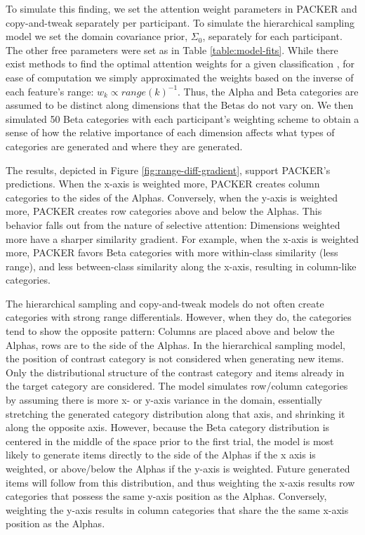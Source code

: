 \documentclass[10pt,letterpaper]{article}
\begin{document}
To simulate this finding, we set the attention weight parameters in PACKER and copy-and-tweak separately per participant. To simulate the hierarchical sampling model we set the domain covariance prior, $\Sigma_0$, separately for each participant. The other free parameters were set as in Table \ref{table:model-fits}. While there exist methods to find the optimal attention weights for a given classification \citep[see][]{vanpaemel2012using}, for ease of computation we simply approximated the weights based on the inverse of each feature's range: $w_k \propto range(k)^{-1}$. Thus, the Alpha and Beta categories are assumed to be distinct along dimensions that the Betas do not vary on. We then simulated 50 Beta categories with each participant's weighting scheme to obtain a sense of how the relative importance of each dimension affects what types of categories are generated and where they are generated. 

The results, depicted in Figure \ref{fig:range-diff-gradient}, support PACKER's predictions. When the x-axis is weighted more, PACKER creates column categories to the sides of the Alphas. Conversely, when the y-axis is weighted more, PACKER creates row categories above and below the Alphas. This behavior falls out from the nature of selective attention: Dimensions weighted more have a sharper similarity gradient. For example, when the x-axis is weighted more, PACKER favors Beta categories with more within-class similarity (less range), and less between-class similarity along the x-axis, resulting in column-like categories.

The hierarchical sampling and copy-and-tweak models do not often create categories with strong range differentials. However, when they do, the categories tend to show the opposite pattern: Columns are placed above and below the Alphas, rows are to the side of the Alphas. In the hierarchical sampling model, the position of contrast category is not considered when generating new items. Only the distributional structure of the contrast category and items already in the target category are considered. The model simulates row/column categories by assuming there is more x- or y-axis variance in the domain, essentially stretching the generated category distribution along that axis, and shrinking it along the opposite axis. However, because the Beta category distribution is centered in the middle of the space prior to the first trial, the model is most likely to generate items directly to the side of the Alphas if the x axis is weighted, or above/below the Alphas if the y-axis is weighted. Future generated items will follow from this distribution, and thus weighting the x-axis results row categories that possess the same y-axis position as the Alphas. Conversely, weighting the y-axis results in column categories that share the the same x-axis position as the Alphas.
\end{document}

